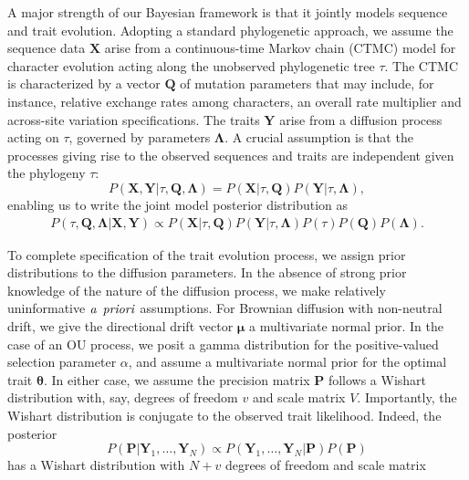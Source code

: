 \documentclass[12pt]{article}
\begin{document}
A major strength of our Bayesian framework is that it jointly models sequence and trait evolution. 
Adopting a standard phylogenetic approach, we 
assume the sequence data $\textbf{X}$ arise from a continuous-time Markov chain (CTMC) model for character evolution 
acting along the unobserved phylogenetic tree $\tau$.  The CTMC is characterized by a vector $\textbf{Q}$ of mutation parameters that
may include, for instance, relative exchange rates among characters, an overall rate multiplier and across-site variation 
specifications.  
The traits $\textbf{Y}$ arise from a diffusion process acting on $\tau$, governed by parameters $\boldsymbol \Lambda$.  A crucial
assumption is that the processes giving rise to the observed sequences and traits are independent given the phylogeny
$\tau$: 
\begin{equation}
P(\textbf{X},\textbf{Y}|\tau,\textbf{Q},\boldsymbol \Lambda) = P(\textbf{X}|\tau, \textbf{Q})P(\textbf{Y}|\tau, \boldsymbol \Lambda),
\end{equation}
enabling us to write the joint model posterior distribution as
\begin{eqnarray}
P(\tau, \textbf{Q}, \boldsymbol \Lambda | \textbf{X},\textbf{Y}) \propto P(\textbf{X}|\tau,\textbf{Q}) P(\textbf{Y}|\tau,\boldsymbol \Lambda) 
P(\tau)P(\textbf{Q})P(\boldsymbol \Lambda) .
\end{eqnarray}
\par
To complete specification of the trait evolution process, we assign prior distributions to the diffusion parameters.
In the absence of strong prior knowledge of the nature of the diffusion process, we make relatively uninformative 
$\it{a}$ $\it{priori}$ assumptions.
For Brownian diffusion with non-neutral drift, we give the directional drift vector $\boldsymbol \mu$ a 
multivariate normal prior.  In the case of an OU process, we posit a gamma distribution for the positive-valued selection 
parameter $\alpha$, and assume a multivariate normal prior for the optimal trait $\boldsymbol \theta$.  In either case,
we assume the precision matrix $\textbf{P}$ follows a Wishart distribution with, say, degrees of freedom $v$ and scale 
matrix $V$.  
Importantly, the Wishart distribution is conjugate to the observed trait likelihood.  Indeed, the posterior
\begin{equation}
P(\textbf{P} | \textbf{Y}_1,\dots,\textbf{Y}_N) \propto  P(\textbf{Y}_1,\dots,\textbf{Y}_N |\textbf{P}) P(\textbf{P})
\end{equation}
has a Wishart distribution with $N+v$ degrees of freedom and scale matrix
\end{document}
